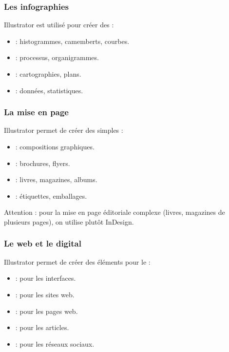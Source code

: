 \subsubsection{Les infographies}

Illustrator est utilisé pour créer des  :

\begin{itemize}
    \item {} : histogrammes, camemberts, courbes.
    \item {} : processus, organigrammes.
    \item {} : cartographies, plans.
    \item {} : données, statistiques.
\end{itemize}

\subsubsection{La mise en page}

Illustrator permet de créer des  simples :

\begin{itemize}
    \item {} : compositions graphiques.
    \item {} : brochures, flyers.
    \item {} : livres, magazines, albums.
    \item {} : étiquettes, emballages.
\end{itemize}

Attention : pour la mise en page éditoriale complexe (livres, magazines de plusieurs pages), on utilise plutôt InDesign.

\subsubsection{Le web et le digital}

Illustrator permet de créer des éléments pour le  :

\begin{itemize}
    \item {} : pour les interfaces.
    \item {} : pour les sites web.
    \item {} : pour les pages web.
    \item {} : pour les articles.
    \item {} : pour les réseaux sociaux.
\end{itemize}

